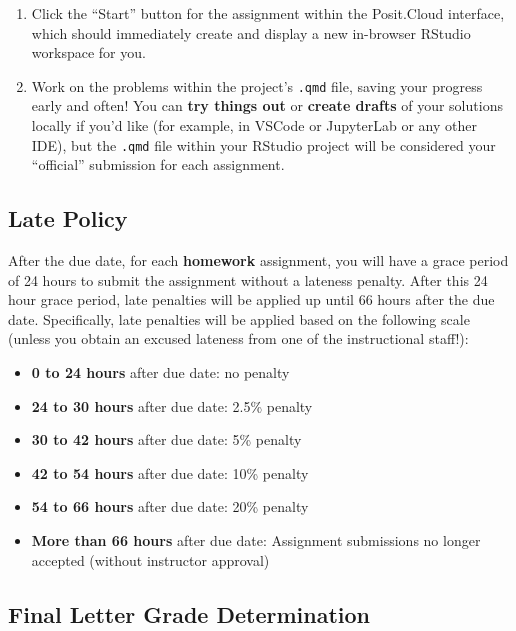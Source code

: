 \documentclass[
]{scrartcl}
\providecommand{\tightlist}{%
  \setlength{\itemsep}{0pt}\setlength{\parskip}{0pt}}\usepackage{longtable,booktabs,array}
\begin{document}
\begin{enumerate}
\def\labelenumi{\arabic{enumi}.}
\tightlist
\item
  Click the ``Start'' button for the assignment within the Posit.Cloud
  interface, which should immediately create and display a new
  in-browser RStudio workspace for you.
\item
  Work on the problems within the project's \texttt{.qmd} file, saving
  your progress early and often! You can \textbf{try things out} or
  \textbf{create drafts} of your solutions locally if you'd like (for
  example, in VSCode or JupyterLab or any other IDE), but the
  \texttt{.qmd} file within your RStudio project will be considered your
  ``official'' submission for each assignment.
\end{enumerate}

\subsection{Late Policy}\label{late-policy}

After the due date, for each \textbf{homework} assignment, you will have
a grace period of 24 hours to submit the assignment without a lateness
penalty. After this 24 hour grace period, late penalties will be applied
up until 66 hours after the due date. Specifically, late penalties will
be applied based on the following scale (unless you obtain an excused
lateness from one of the instructional staff!):

\begin{itemize}
\tightlist
\item
  \textbf{0 to 24 hours} after due date: no penalty
\item
  \textbf{24 to 30 hours} after due date: 2.5\% penalty
\item
  \textbf{30 to 42 hours} after due date: 5\% penalty
\item
  \textbf{42 to 54 hours} after due date: 10\% penalty
\item
  \textbf{54 to 66 hours} after due date: 20\% penalty
\item
  \textbf{More than 66 hours} after due date: Assignment submissions no
  longer accepted (without instructor approval)
\end{itemize}

\subsection{Final Letter Grade
Determination}\label{final-letter-grade-determination}
\end{document}
